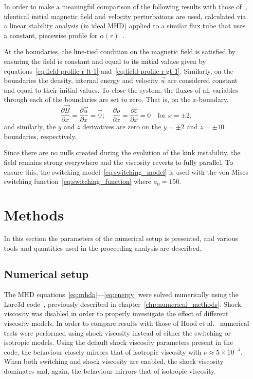 In order to make a meaningful comparison of the following results with those of~\cite{hoodCoronalHeatingMagnetic2009}, identical initial magnetic field and velocity perturbations are used, calculated via a linear stability analysis (in ideal MHD) applied to a similar flux tube that uses a constant, piecewise profile for $\alpha(r)$~\cite{vanderlindenCompleteCoronalLoop1999,browningSolarCoronalHeating2003c,browningHeatingCoronaNanoflares2008a}.

At the boundaries, the line-tied condition on the magnetic field is satisfied by ensuring the field is constant and equal to its initial values given by equations~\eqref{eq:field-profile-r-lt-1} and~\eqref{eq:field-profile-r-gt-1}. Similarly, on the boundaries the density, internal energy and velocity $\vec{u}$ are considered constant and equal to their initial values. To close the system, the fluxes of all variables through each of the boundaries are set to zero. That is, on the $x$-boundary,
\begin{equation}
  \frac{\partial \vec{B}}{\partial x} = \frac{\partial \vec{u}}{\partial x} = \vec{0}; \quad \frac{\partial \rho}{\partial x} = \frac{\partial \varepsilon}{\partial x} = 0 \quad \text{for } x=\pm 2,
\end{equation}
and similarly, the $y$ and $z$ derivatives are zero on the $y=\pm2$ and $z=\pm10$ boundaries, respectively.

Since there are no nulls created during the evolution of the kink instability, the field remains strong everywhere and the viscosity reverts to fully parallel. To ensure this, the switching model~\ref{eq:switching_model} is used with the von Mises switching function~\ref{eq:switching_function} where $a_0 = 150$. 

\section{Methods}
\label{sec:general-numerical-setup}

In this section the parameters of the numerical setup is presented, and various tools and quantities used in the proceeding analysis are described.

\subsection{Numerical setup}

The MHD equations~\eqref{eq:mhda}---\eqref{eq:energy} were solved numerically using the Lare3d code~\cite{arberStaggeredGridLagrangian2001}, previously described in chapter~\ref{chp:numerical_methods}. Shock viscosity was disabled in order to properly investigate the effect of different viscosity models. In order to compare results with those of Hood et al.~\cite{hoodCoronalHeatingMagnetic2009} numerical tests were performed using shock viscosity instead of either the switching or isotropic models. Using the default shock viscosity parameters present in the code, the behaviour closely mirrors that of isotropic viscosity with $\nu\approx 5\times10^{-4}$. When both switching and shock viscosity are enabled, the shock viscosity dominates and, again, the behaviour mirrors that of isotropic viscosity.

